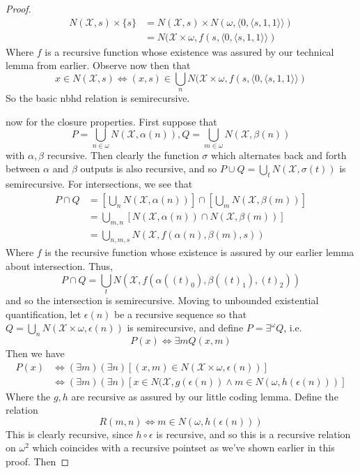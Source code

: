 \documentclass{article}
\theoremstyle{definition}
\theoremstyle{plain}
\begin{document}
\begin{proof}
\begin{align}
 	N(\mathcal{X},s) \times \{s\} &= N(\mathcal{X},s) \times N(\omega,\langle 0, \langle s,1,1 \rangle \rangle ) \\
 		&= N(\mathcal{X} \times \omega, f(s,\langle 0,\langle s,1,1 \rangle \rangle )
\end{align}
Where $f$ is a recursive function whose existence was assured by our technical lemma from earlier. Observe now then that
\[x \in N(\mathcal{X},s) \iff (x,s) \in \bigcup_n N(\mathcal{X} \times \omega, f(s,\langle 0,\langle s,1,1 \rangle \rangle)  \]
So the basic nbhd relation is semirecursive. 
\par now for the closure properties. First suppose that 
\[ P = \bigcup_{n \in \omega} N(\mathcal{X},\alpha(n)), Q = \bigcup_{m \in \omega} N(\mathcal{X},\beta(n)) \]
with $\alpha,\beta$ recursive. Then clearly the function $\sigma$ which alternates back and forth between $\alpha$ and $\beta$ outputs is also recursive, and so $P \cup Q = \bigcup_t N(\mathcal{X},\sigma(t))$ is semirecursive. For intersections, we see that 
\begin{align}
	P \cap Q &= \left[ \bigcup_n N(\mathcal{X},\alpha(n))\right] \cap \left[ \bigcup_m N(\mathcal{X},\beta(m))\right] \\
			&= \bigcup_{m,n} \left[ N(\mathcal{X},\alpha(n)) \cap N(\mathcal{X},\beta(m)) \right] \\
			&= \bigcup_{n,m,s} N(\mathcal{X},f(\alpha(n),\beta(m),s))
\end{align}
Where $f$ is the recursive function whose existence is assured by our earlier lemma about intersection. Thus,
\[ P \cap Q = \bigcup_t N(\mathcal{X},f(\alpha((t)_0),\beta((t)_1),(t)_2)) \]
and so the intersection is semirecursive. Moving to unbounded existential quantification, let $\epsilon(n)$ be a recursive sequence so that $Q = \bigcup_n N(\mathcal{X} \times \omega, \epsilon(n))$ is semirecursive, and define $P = \exists^{\omega} Q$, i.e.
\[P(x) \iff \exists m Q(x,m) \]
Then we have
\begin{align}
	P(x) &\iff (\exists m)(\exists n)[(x,m) \in N(\mathcal{X} \times \omega, \epsilon(n))] \\
		&\iff (\exists m)(\exists n)[x \in N(\mathcal{X},g(\epsilon(n)) \wedge m \in N(\omega,h(\epsilon(n)))] 
\end{align}
Where the $g,h$ are recursive as assured by our little coding lemma. Define the relation 
\[ R(m,n) \iff m \in N(\omega,h(\epsilon(n))) \]
This is clearly recursive, since $h \circ \epsilon$ is recursive, and so this is a recursive relation on $\omega^2$ which coincides with a recursive pointset as we've shown earlier in this proof. Then

\end{proof}
\end{document}
